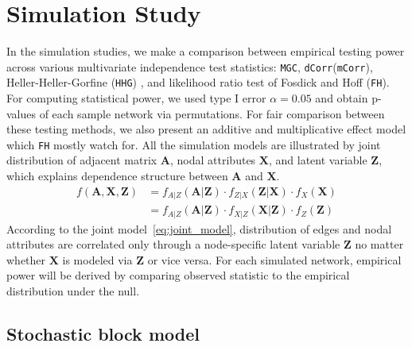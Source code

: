 \documentclass[12pt]{article}
\theoremstyle{definition}
\begin{document}
\section{Simulation Study}
\label{sec:sim}
	
In the simulation studies, we make a comparison between empirical testing power across various multivariate independence test statistics: \texttt{MGC}, \texttt{dCorr}(\texttt{mCorr}), Heller-Heller-Gorfine (\texttt{HHG}) \citep{heller2012consistent}, and likelihood ratio test of Fosdick and Hoff (\texttt{FH}). For computing statistical power, we used type I error $\alpha = 0.05$ and obtain p-values of each sample network via permutations. For fair comparison between these testing methods, we also present an additive and multiplicative effect model which \texttt{FH} mostly watch for. All the simulation models are illustrated by joint distribution of adjacent matrix $\mathbf{A}$, nodal attributes $\mathbf{X}$, and latent variable $\mathbf{Z}$, which explains dependence structure between $\mathbf{A}$ and $\mathbf{X}$. 
\begin{equation}
\begin{split}
f(\mathbf{A}, \mathbf{X}, \mathbf{Z}) & = f_{A | Z}(\mathbf{A} | \mathbf{Z}) \cdot f_{Z | X}(\mathbf{Z} | \mathbf{X}) \cdot f_{X}(\mathbf{X}) 
\\ & = f_{A | Z}(\mathbf{A} | \mathbf{Z}) \cdot  f_{X | Z}(\mathbf{X} | \mathbf{Z} ) \cdot f_{Z} (\mathbf{Z}) 
\end{split}
\label{eq:joint_model}
\end{equation}	
According to the joint model~\ref{eq:joint_model}, distribution of edges and nodal attributes are correlated only through a node-specific latent variable $\mathbf{Z}$ no matter whether $\mathbf{X}$ is modeled via $\mathbf{Z}$ or vice versa. For each simulated network, empirical power will be derived by comparing observed statistic to the empirical distribution under the null. 
						
\subsection{Stochastic block model}
\end{document}
